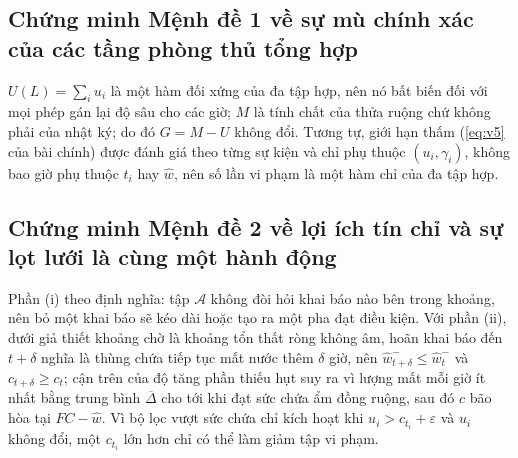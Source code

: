 \subsection*{Chứng minh Mệnh đề 1 về sự mù chính xác của các tầng phòng thủ tổng hợp}

$U(L)=\sum_i u_i$ là một hàm đối xứng của đa tập hợp, nên nó bất biến đối với mọi phép gán
lại độ sâu cho các giờ; $M$ là tính chất của thửa ruộng chứ không phải của nhật ký; do đó
$G=M-U$ không đổi. Tương tự, giới hạn thấm (\eqref{eq:v5} của bài chính) được đánh giá
theo từng sự kiện và chỉ phụ thuộc $(u_i,\gamma_i)$, không bao giờ phụ thuộc $t_i$ hay
$\hat w$, nên số lần vi phạm là một hàm chỉ của đa tập hợp.

\subsection*{Chứng minh Mệnh đề 2 về lợi ích tín chỉ và sự lọt lưới là cùng một hành động}

Phần (i) theo định nghĩa: tập $\mathcal{A}$ không đòi hỏi khai báo nào bên trong
khoảng, nên bỏ một khai báo sẽ kéo dài hoặc tạo ra một pha đạt điều kiện. Với phần
(ii), dưới giả thiết khoảng chờ là khoảng tổn thất ròng không âm, hoãn khai báo đến
$t+\delta$ nghĩa là thùng chứa tiếp tục mất nước thêm $\delta$ giờ, nên
$\hat w_{t+\delta}^{-}\le\hat w_t^{-}$ và
$c_{t+\delta}\ge c_t$; cận trên của độ tăng phần thiếu hụt suy ra vì lượng
mất mỗi giờ ít nhất bằng trung bình $\overline{\Delta}$ cho tới khi đạt sức
chứa ẩm đồng ruộng, sau đó $c$ bão hòa tại $FC-\hat w$. Vì bộ lọc vượt sức chứa
chỉ kích hoạt khi $u_i>c_{t_i}+\varepsilon$ và $u_i$ không đổi, một $c_{t_i}$ lớn
hơn chỉ có thể làm giảm tập vi phạm.

